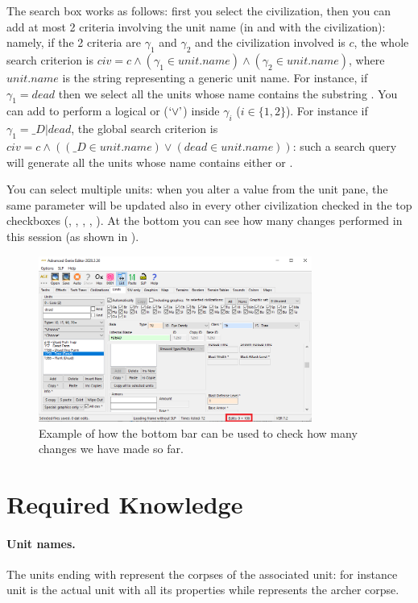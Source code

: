    The search box works as follows: first you select the civilization, then you can add at most 2 criteria involving the unit name (in and with the civilization): namely, if the 2 criteria are $\gamma_1$ and $\gamma_2$ and the civilization involved is $c$, the whole search criterion is $civ = c \land (\gamma_1 \in unit.name) \land (\gamma_2 \in unit.name)$, where $unit.name$ is the string representing a generic unit name. For instance, if $\gamma_{1} = dead$ then we select all the units whose name contains the substring . You can add \dquote{|} to perform a logical or ($\squote{\lor}$) inside $\gamma_{i}$ ($i \in \{1,2\}$). For instance if $\gamma_{1} = \_D|dead$, the global search criterion is $civ = c \land ((\_D \in unit.name) \lor (dead \in unit.name))$: such a search query will generate all the units whose name contains either  or .

    You can select multiple units: when you alter a value from the unit pane, the same parameter will be updated also in every other civilization checked in the top checkboxes (\eg{}, , , , ). At the bottom you can see how many changes performed in this session (as shown in ).

    \begin{figure}[ht]
        \centering
        \includegraphics[width=0.8\textwidth]{src/images/bottom-bar}
        \caption{Example of how the bottom bar can be used to check how many changes we have made so far.}
        \label{fig:bottombar}
    \end{figure}

    \section{Required Knowledge}

    \paragraph{Unit names.}
    The units ending with  represent the corpses of the associated unit: for instance  unit is the actual unit with all its properties while  represents the archer corpse.

